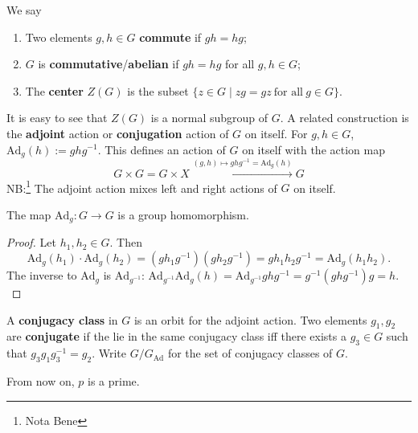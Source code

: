 \begin{definition}[]
   We say
   \begin{enumerate}[label=(\alph*)]
   \setlength\itemsep{-.2em}
       \item Two elements $g,h \in G$ \textbf{commute} if $gh=hg$; 
        \item $G$ is \textbf{commutative}/\textbf{abelian} if $gh=hg$ for all $g,h \in G$;
    \item The \textbf{center} $Z(G)$ is the subset $\{z \in G \mid zg=gz \ \text{for all} \ g \in G\} $. 
   \end{enumerate}
\end{definition}
It is easy to see that $Z(G)$ is a normal subgroup of $G$. A related construction is the \textbf{adjoint} action or \textbf{conjugation} action of $G$ on itself. For $g,h \in G$, $\mathrm{Ad}_g(h):=gh g^{-1}$. This defines an action of $G$ on itself with the action map \[
    G \times G =G \times X \xrightarrow{(g,h) \mapsto  ghg^{-1}=\mathrm{Ad}_g(h)} G
\] NB:\footnote{Nota Bene} The adjoint action mixes left and right actions of $G$ on itself.

\begin{lemma}
    The map $\mathrm{Ad}_g\colon G \to G$ is a group homomorphism.
\end{lemma}
\begin{proof}
    Let $h_1,h_2 \in G$. Then \[
        \mathrm{Ad}_g(h_1) \cdot \mathrm{Ad}_g(h_2)=(g h_1 g^{-1})(g h_2 g^{-1})=gh_1h_2 g^{-1}=\mathrm{Ad}_g(h_1h_2).
    \] The inverse to $\mathrm{Ad}_g$ is $\mathrm{Ad}_{g^{-1}}$: $\mathrm{Ad}_{g^{-1}} \mathrm{Ad}_g(h)=\mathrm{Ad}_{g^{-1}}ghg^{-1}=g^{-1}(ghg^{-1})g=h .$
\end{proof}

\begin{definition}[]
    A \textbf{conjugacy class} in $G$ is an orbit for the adjoint action. Two elements $g_1,g_2$ are \textbf{conjugate} if the lie in the same conjugacy class iff there exists a $g_3 \in G$ such that $g_3g_1g_3^{-1}=g_2$. Write $G / G_{ \mathrm{Ad}}$ for the set of conjugacy classes of $G$.
\end{definition}

From now on, $p$ is a prime.

